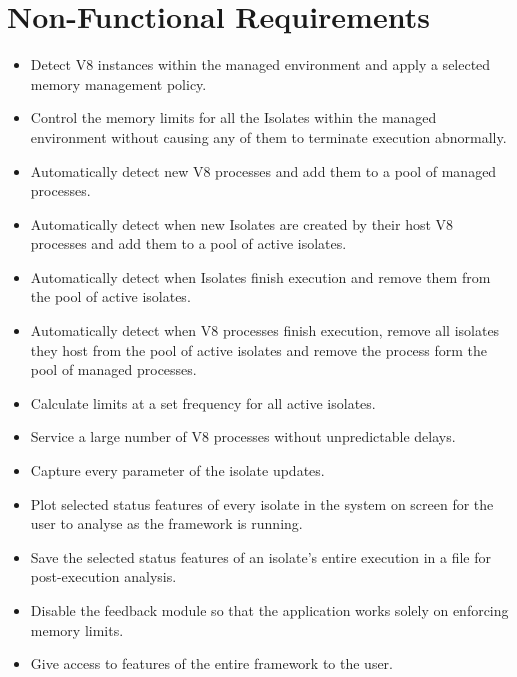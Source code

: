 \documentclass{l4proj}
\begin{document}
\section{Non-Functional Requirements}
\begin{itemize}
\item Detect V8 instances within the managed environment and apply a selected memory management policy.
\item Control the memory limits for all the Isolates within the managed environment without causing any of them to terminate execution abnormally.
\item Automatically detect new V8 processes and add them to a pool of managed processes.
\item Automatically detect when new Isolates are created by their host V8 processes and add them to a pool of active isolates.
\item Automatically detect when Isolates finish execution and remove them from the pool of active isolates.
\item Automatically detect when V8 processes finish execution, remove all isolates they host from the pool of active isolates and remove the process form the pool of managed processes.
\item Calculate limits at a set frequency for all active isolates.
\item Service a large number of V8 processes without unpredictable delays.
\item Capture every parameter of the isolate updates.
\item Plot selected status features of every isolate in the system on screen for the user to analyse as the framework is running.
\item Save the selected status features of an isolate's entire execution in a file for post-execution analysis.
\item Disable the feedback module so that the application works solely on enforcing memory limits.
\item Give access to features of the entire framework to the user.
\end{itemize}
\end{document}
